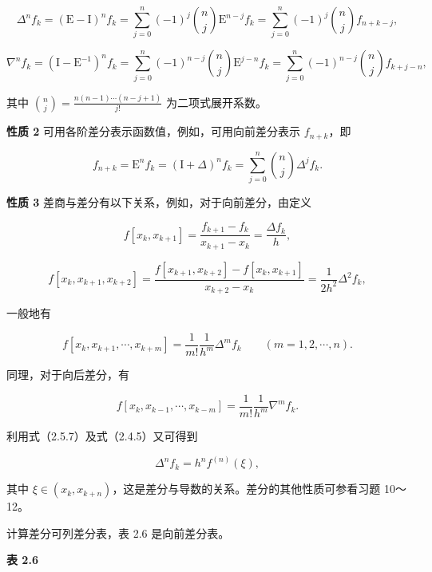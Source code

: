 \documentclass[
  10pt,
  fontset=fandol]{ctexart}
\begin{document}
\[
\Delta^n f_k=(\mathrm{E}-\mathrm{I})^n f_k
=\sum_{j=0}^{n}(-1)^j\binom{n}{j}\mathrm{E}^{n-j}f_k
=\sum_{j=0}^{n}(-1)^j\binom{n}{j}f_{n+k-j},
\tag{2.5.4}
\]

\[
\nabla^n f_k=(\mathrm{I}-\mathrm{E}^{-1})^n f_k
=\sum_{j=0}^{n}(-1)^{n-j}\binom{n}{j}\mathrm{E}^{j-n}f_k
=\sum_{j=0}^{n}(-1)^{n-j}\binom{n}{j}f_{k+j-n},
\tag{2.5.5}
\]

其中 \(\displaystyle\binom{n}{j}=\frac{n(n-1)\cdots(n-j+1)}{j!}\) 为二项式展开系数。

\textbf{性质 2} 可用各阶差分表示函数值，例如，可用向前差分表示 \(f_{n+k}\)，即

\[
f_{n+k}=\mathrm{E}^n f_k=(\mathrm{I}+\Delta)^n f_k=\sum_{j=0}^{n}\binom{n}{j}\Delta^j f_k.
\tag{2.5.6}
\]

\textbf{性质 3} 差商与差分有以下关系，例如，对于向前差分，由定义

\[
f[x_k,x_{k+1}]=\frac{f_{k+1}-f_k}{x_{k+1}-x_k}=\frac{\Delta f_k}{h},
\]

\[
f[x_k,x_{k+1},x_{k+2}]=\frac{f[x_{k+1},x_{k+2}]-f[x_k,x_{k+1}]}{x_{k+2}-x_k}=\frac{1}{2h^2}\Delta^2 f_k,
\]

一般地有

\[
f[x_k,x_{k+1},\cdots,x_{k+m}]=\frac{1}{m!}\frac{1}{h^m}\Delta^m f_k\qquad(m=1,2,\cdots,n).
\tag{2.5.7}
\]

同理，对于向后差分，有

\[
f[x_k,x_{k-1},\cdots,x_{k-m}]=\frac{1}{m!}\frac{1}{h^m}\nabla^m f_k.
\tag{2.5.8}
\]

利用式（2.5.7）及式（2.4.5）又可得到

\[
\Delta^n f_k=h^n f^{(n)}(\xi),
\tag{2.5.9}
\]

其中 \(\xi\in(x_k,x_{k+n})\)，这是差分与导数的关系。差分的其他性质可参看习题 10～12。

计算差分可列差分表，表 2.6 是向前差分表。

\textbf{表 2.6}
\end{document}
